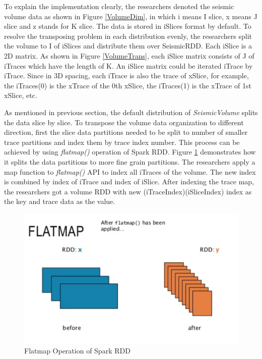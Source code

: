 To explain the implementation clearly, the researchers denoted the seismic volume data as shown in Figure \ref{VolumeDim}, in which i means I slice, x means J slice and z stands for K slice. The data is stored in iSlices format by default. To resolve the transposing problem in each distribution evenly, the researchers split the volume to I of iSlices and distribute them over SeismicRDD. Each iSlice is a 2D matrix. As shown in Figure \ref{VolumeTrans}, each iSlice matrix consists of J of iTraces which have the length of K. An iSlice matrix could be iterated iTrace by iTrace. Since in 3D spacing, each iTrace is also the trace of xSlice, for example, the iTraces(0) is the xTrace of the 0th xSlice, the iTraces(1) is the xTrace of 1st xSlice, etc. 

As mentioned in previous section, the default distribution of \emph{SeismicVolume} splits the data slice by slice. To transpose the volume data organization to different direction,  first the slice data partitions needed to be split to number of smaller trace partitions and index them by trace index number. This process can be achieved by using \emph{flatmap()} operation of Spark RDD. Figure \ref{RDDFlatmap} demonstrates how it splits the data partitions to more fine grain partitions. The researchers apply a map function to \emph{flatmap()} API to index all iTraces of the volume. The new index is combined by index of iTrace and index of iSlice. After indexing the trace map, the researchers got a volume RDD with new (iTraceIndex)(iSliceIndex) index as the key and trace data as the value.

\begin{figure}[h]
\centering
\includegraphics[scale=0.8]{figures/RDDFlatmap.png}
\caption{Flatmap Operation of Spark RDD}
\label{RDDFlatmap}
\end{figure}


